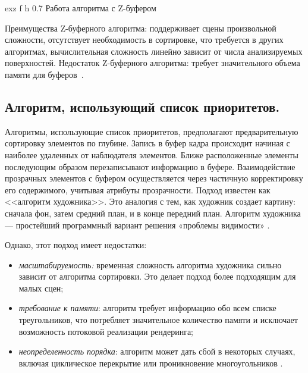 	{exz} %
	{f} %
	{h} %
	{0.7\textwidth} %
	{Работа алгоритма с Z-буфером} %

Преимущества Z-буферного алгоритма: поддерживает сцены произвольной сложности,
отсутствует необходимость в сортировке, что требуется в других алгоритмах,
вычислительная сложность линейно зависит от числа анализируемых поверхностей. Недостаток Z-буферного алгоритма: требует значительного объема памяти для буферов~\cite{del_line}.




\subsection{Алгоритм, использующий список приоритетов.}

Алгоритмы, использующие список приоритетов, предполагают предварительную сортировку элементов по глубине. Запись в буфер кадра происходит начиная с наиболее удаленных от наблюдателя элементов. Ближе расположенные элементы последующим образом перезаписывают информацию в буфере. Взаимодействие прозрачных элементов с буфером осуществляется через частичную корректировку его содержимого, учитывая атрибуты прозрачности. Подход известен как <<алгоритм художника>>. Это аналогия с тем, как художник создает картину: сначала фон, затем средний план, и в конце передний план. Алгоритм художника --- простейший программный вариант решения «проблемы видимости» \cite{light, del_line}. 

Однако, этот подход имеет недостатки:
\begin{itemize}
	\item \textit{масштабируемость:} временная сложность алгоритма художника сильно зависит от алгоритма сортировки. Это делает подход более подходящим для малых сцен;
	\item \textit{требование к памяти}: алгоритм требует информацию обо всем списке треугольников, что потребляет значительное количество памяти и исключает возможность потоковой реализации рендеринга;
	\item \textit{неопределенность порядка}: алгоритм может дать сбой в некоторых случаях, включая циклическое перекрытие или проникновение многоугольников \cite{light}.
\end{itemize}

